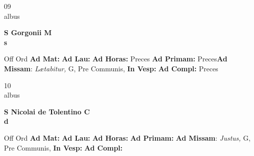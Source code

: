 \documentclass[10pt, openany]{book}
\begin{document}
    \begin{center}
        \begin{minipage}{3.5in}
            \vspace{2em}
            \begin{minipage}{0.5in}
                {\Huge 09} \\
                {\normalsize albus}
            \end{minipage}
            \begin{minipage}{3.0in}
                \textbf{ \large S Gorgonii M \\
                \textnormal{\normalsize s}}

            \end{minipage}
            \begin{justify}Off Ord
                \textbf{Ad Mat: }
                \textbf{Ad Lau: }
                \textbf{Ad Horas: }Preces
                \textbf{Ad Primam: }Preces\textbf{Ad Missam}: \textit{Lætabitur,} G, Pre Communis, 
                \textbf{In Vesp: }
                \textbf{Ad Compl: }Preces
            \end{justify}
        \end{minipage}
    \end{center}

    \begin{center}
        \begin{minipage}{3.5in}
            \vspace{2em}
            \begin{minipage}{0.5in}
                {\Huge 10} \\
                {\normalsize albus}
            \end{minipage}
            \begin{minipage}{3.0in}
                \textbf{ \large S Nicolai de Tolentino C \\
                \textnormal{\normalsize d}}

            \end{minipage}
            \begin{justify}Off Ord
                \textbf{Ad Mat: }
                \textbf{Ad Lau: }
                \textbf{Ad Horas: }
                \textbf{Ad Primam: }\textbf{Ad Missam}: \textit{Justus,} G, Pre Communis, 
                \textbf{In Vesp: }
                \textbf{Ad Compl: }
            \end{justify}
        \end{minipage}
    \end{center}
\end{document}
